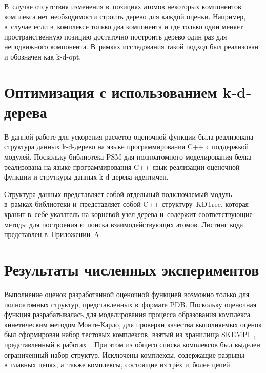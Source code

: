 В~случае отсутствия изменения в~позициях атомов некоторых компонентов комплекса нет необходимости строить дерево для каждой оценки. Например, в~случае если в~комплексе только два компонента и где только один меняет пространственную позицию достаточно построить дерево один раз для неподвижного компонента. В~рамках исследования такой подход был реализован и обозначен как k-d-opt.


\section{Оптимизация с использованием k-d-дерева}


В данной работе для ускорения расчетов оценочной функции была реализована структура данных k-d-дерево на языке программирования C++ с поддержкой модулей. Поскольку библиотека PSM для полноатомного моделирования белка реализована на языке программирования C++ язык реализации оценочной функции и струткуры данных k-d-дерева идентичен.

Структура данных представляет собой отдельный подключаемый модуль в~рамках библиотеки и~представляет собой C++ структуру~KDTree, которая хранит в~себе указатель на корневой узел дерева и~содержит соответствующие методы для построения и~поиска взаимодействующих атомов. Листинг кода представлен в~Приложении~A.





\section{Результаты численных экспериментов}

Выполнение оценок разработанной оценочной функцией возможно только для полноатомных структур, представленных в~формате PDB. Поскольку оценочная функция разрабатывалась для моделирования процесса образования комплекса кинетическим методом Монте-Карло, для проверки качества выполняемых оценок был сформирован набор тестовых комплексов, взятый из хранилища SKEMPI~\cite{skempi}, представленный в работах~\cite{biom10071056, rate}. При этом из общего списка комплексов был выделен ограниченный набор структур. Исключены комплексы, содержащие разрывы в~главных цепях, а~также комплексы, состоящие из трёх и~более цепей. 

